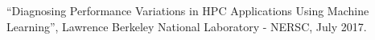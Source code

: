 \begin{resume}
  ``Diagnosing Performance Variations in HPC Applications Using Machine Learning'',
  Lawrence Berkeley National Laboratory - NERSC, July 2017.



















\end{resume}

